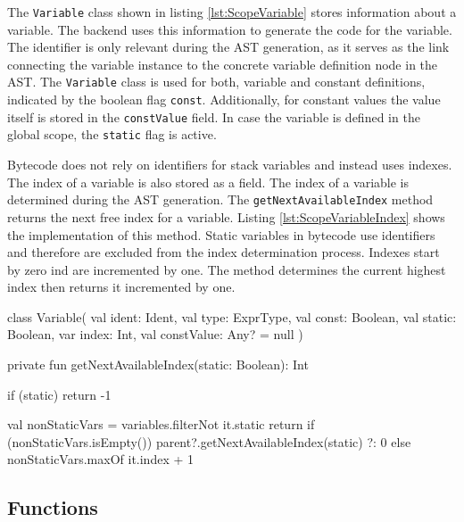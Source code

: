 The \verb|Variable| class shown in listing \ref{lst:ScopeVariable} stores information about a variable. The backend uses this information to generate the code for the variable. The identifier is only relevant during the AST generation, as it serves as the link connecting the variable instance to the concrete variable definition node in the AST. The \verb|Variable| class is used for both, variable and constant definitions, indicated by the boolean flag \verb|const|. Additionally, for constant values the value itself is stored in the \verb|constValue| field. In case the variable is defined in the global scope, the \verb|static| flag is active. 

Bytecode does not rely on identifiers for stack variables and instead uses indexes. The index of a variable is also stored as a field. The index of a variable is determined during the AST generation. The \verb|getNextAvailableIndex| method returns the next free index for a variable. Listing \ref{lst:ScopeVariableIndex} shows the implementation of this method. Static variables in bytecode use identifiers and therefore are excluded from the index determination process. Indexes start by zero ind are incremented by one. The method determines the current highest index then returns it incremented by one. 


\begin{KotlinCode}[float,numbers=none,caption=Implementation of the \texttt{Variable} class., label=lst:ScopeVariable]
class Variable(
    val ident: Ident,
    val type: ExprType,
    val const: Boolean,
    val static: Boolean,
    var index: Int,
    val constValue: Any? = null
)
\end{KotlinCode}

\begin{KotlinCode}[float,numbers=none,caption=Implementation of the \texttt{getNextAvailableIndex} method., label=lst:ScopeVariableIndex]
private fun getNextAvailableIndex(static: Boolean): Int {
       if (static) 
           return -1
       
       val nonStaticVars = variables.filterNot { it.static }
       return if (nonStaticVars.isEmpty()) {
           parent?.getNextAvailableIndex(static) ?: 0
       } else {
           nonStaticVars.maxOf { it.index } + 1
       }
}
\end{KotlinCode}

\subsection{Functions}

